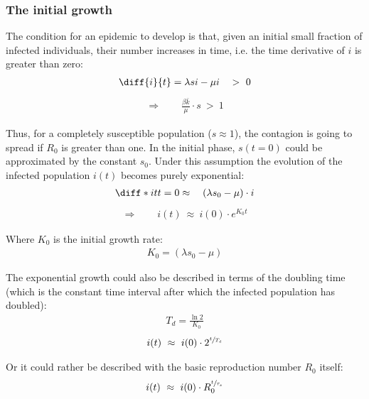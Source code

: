 \documentclass[DIV=12, BCOR=0pt]{scrartcl}  %
\begin{document}
  \subsubsection{The initial growth}
  The condition for an epidemic to develop is that, given an initial small fraction of infected individuals, their number increases in time, i.e. the time derivative of $i$ is greater than zero:
  \begin{align}
  	\diff{i}{t} = \lambda s i - \mu i \quad > \ 0 
  	\label{sir_growthCond}
  \end{align}
  \begin{align} \Rightarrow \qquad
  	\frac{\beta \bar{k} }{\mu} \cdot s \ > \ 1  %
  	\label{eq:sir_growthReq}
  \end{align}
  
  Thus, for a completely susceptible population ($s \approx 1$), the contagion is going to spread if $R_0$ is greater than one. In the initial phase, $s( t \! = \! 0)$ could be approximated by the constant $s_0$.
  Under this assumption the evolution of the infected population $i(t)$ becomes purely exponential:
  \begin{align}
  	\diff*{i}{t}{t=0} \approx \quad (\lambda s_0 - \mu) \cdot i 
  	\label{eq:sir_approxi}
  \end{align}
  \begin{align} \Rightarrow \qquad
  	i(t) \ \approx \ i(0) \cdot e^{K_0 t} 
  	\label{eq:sir_growthK0}
  \end{align}
  
 Where $K_0$ is the initial growth rate:
 \begin{align} %
 	K_0 = (\lambda s_0 - \mu)
 	\label{eq:sir_K0}
 \end{align}
 
 The exponential growth could also be described in terms of the doubling time (which is the constant time interval after which the infected population has doubled):
	\begin{align}
		T_{d} = \frac{\ln 2}{K_0} %
		\label{eq:doubling} 
	\end{align}
	\begin{align} %
		i(t) \ \approx \ i(0) \cdot 2^{\sfrac{t}{T_{d}}}
		\label{eq:sir_growthTd} 
	\end{align}

	Or it could rather be described with the basic reproduction number $R_0$ itself:
	\begin{align}
		i(t) \ \approx \ i(0) \cdot R_0^{\sfrac{t}{\tau_s}}
		\label{eq:sir_growthR0}
	\end{align}
\end{document}
